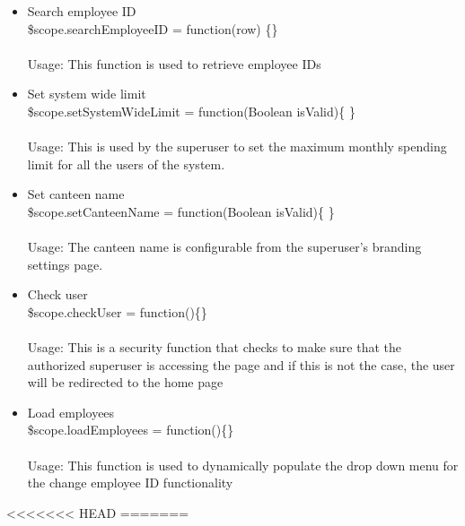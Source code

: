 \documentclass[a4paper,12pt]{article}
\begin{document}
\begin{enumerate}
\begin{itemize}
		\item Search employee ID \\ \$scope.searchEmployeeID = function(row) \{\}
		\\ \\ Usage: This function is used to retrieve employee IDs 
		\item Set system wide limit \\ \$scope.setSystemWideLimit = function(Boolean isValid)\{ \} \\ \\ Usage: This is used by the superuser to set the maximum monthly spending limit for all the users of the system.
		 \item Set canteen name \\ \$scope.setCanteenName = function(Boolean isValid)\{ \}
		\\ \\ Usage: The canteen name is configurable from the superuser's branding settings page.
		\item Check user \\ \$scope.checkUser = function()\{\}
		\\ \\Usage: This is a security function that checks to make sure that the authorized superuser is accessing the page and if this is not the case, the user will be redirected to the home page
		\item Load employees \\ \$scope.loadEmployees = function()\{\}
		\\ \\Usage: This function is used to dynamically populate the drop down menu for the change employee ID functionality
	\end{itemize}
\end{enumerate}
<<<<<<< HEAD
=======
\end{document}
